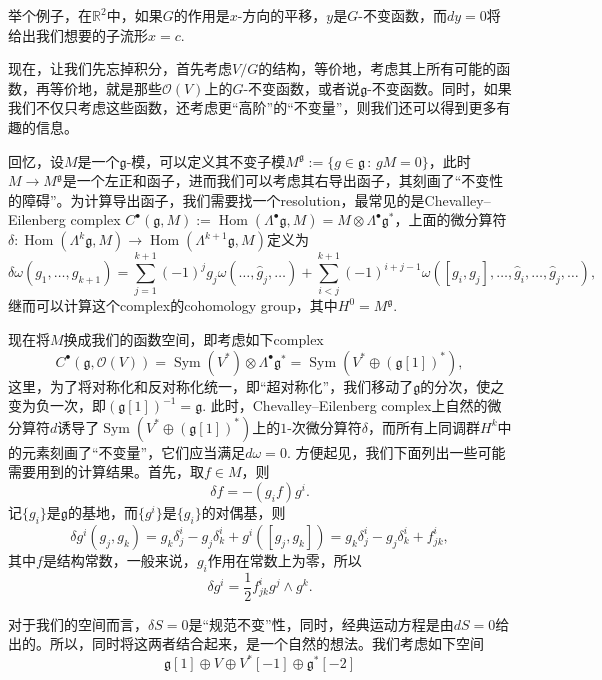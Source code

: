 \documentclass[12pt]{article}
\theoremstyle{definition}
\theoremstyle{plain}
\begin{document}
举个例子，在$\mathbb R^2$中，如果$G$的作用是$x$-方向的平移，$y$是$G$-不变函数，而$dy=0$将给出我们想要的子流形$x=c$.

现在，让我们先忘掉积分，首先考虑$V/G$的结构，等价地，考虑其上所有可能的函数，再等价地，就是那些$\mathscr O(V)$上的$G$-不变函数，或者说$\mathfrak{g}$-不变函数。同时，如果我们不仅只考虑这些函数，还考虑更“高阶”的“不变量”，则我们还可以得到更多有趣的信息。

回忆，设$M$是一个$\mathfrak g$-模，可以定义其不变子模$M^{\mathfrak g}:=\{g \in \mathfrak g\,:\, gM=0\}$，此时$M\to M^{\mathfrak g}$是一个左正和函子，进而我们可以考虑其右导出函子，其刻画了“不变性的障碍”。为计算导出函子，我们需要找一个resolution，最常见的是Chevalley–Eilenberg complex $C^\bullet(\mathfrak g,M):=\operatorname{Hom}(\Lambda^\bullet \mathfrak g,M)=M\otimes \Lambda^\bullet \mathfrak g^*$，上面的微分算符$\delta:\operatorname{Hom}(\Lambda^k \mathfrak g,M)\to \operatorname{Hom}(\Lambda^{k+1} \mathfrak g,M)$定义为
\[
    \delta\omega(g_1,\dots,g_{k+1})=\sum_{j=1}^{k+1} (-1)^{j}g_j\omega(\dots,\hat{g}_j,\dots)+\sum_{i<j}^{k+1} (-1)^{i+j-1}\omega([g_i,g_j],\dots,\hat{g}_i,\dots,\hat{g}_j,\dots),
\]继而可以计算这个complex的cohomology group，其中$H^0=M^{\mathfrak g}$.

现在将$M$换成我们的函数空间，即考虑如下complex
\[
C^\bullet(\mathfrak g,\mathcal O(V))=\operatorname{Sym}(V^*)\otimes \Lambda^\bullet \mathfrak g^*
=\operatorname{Sym}(V^*\oplus (\mathfrak g[1])^*),
\]这里，为了将对称化和反对称化统一，即“超对称化”，我们移动了$\mathfrak g$的分次，使之变为负一次，即$(\mathfrak g[1])^{-1}=\mathfrak g$. 此时，Chevalley–Eilenberg complex上自然的微分算符$d$诱导了$\operatorname{Sym}(V^*\oplus (\mathfrak g[1])^*)$上的$1$-次微分算符$\delta$，而所有上同调群$H^k$中的元素刻画了“不变量”，它们应当满足$d\omega=0$. 方便起见，我们下面列出一些可能需要用到的计算结果。首先，取$f\in M$，则
\[
    \delta f=-(g_if)g^i.
\]
记$\{g_i\}$是$\mathfrak g$的基地，而$\{g^i\}$是$\{g_i\}$的对偶基，则
\[
    \delta g^i(g_j,g_k)=g_k\delta^i_j-g_j\delta^i_{k}+g^i([g_j,g_k])=g_k\delta^i_j-g_j\delta^i_{k}+f^i_{jk},
\]
其中$f$是结构常数，一般来说，$g_i$作用在常数上为零，所以
\[
    \delta g^i=\frac 12 f^i_{jk}g^j\wedge g^k.
\]

对于我们的空间而言，$\delta S=0$是“规范不变”性，同时，经典运动方程是由$dS=0$给出的。所以，同时将这两者结合起来，是一个自然的想法。我们考虑如下空间
\[
    \mathfrak g[1]\oplus V\oplus V^*[-1]\oplus \mathfrak g^*[-2]
\]
\end{document}
